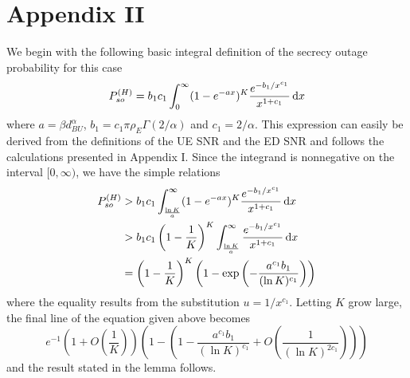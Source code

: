 \documentclass[10pt]{IEEEtran}
\newcommand{\rmd}{\,{\rm d}}
\begin{document}
\section*{Appendix II}\label{app2}
We begin with the following basic integral definition of the secrecy outage probability for this case
\begin{equation}
  P_{so}^{(H)} = b_1 c_1\int_{0}^{\infty}(1-e^{-a x})^K\frac{e^{-b_1/x^{c_1}}}{x^{{1+c_1}}} \rmd x
\end{equation}
where $a = \beta d_{BU}^\alpha$, $b_1 = c_1\pi \rho_E \Gamma(2/\alpha)$ and $c_1 = 2/\alpha$.  This expression can easily be derived from the definitions of the UE SNR and the ED SNR and follows the calculations presented in Appendix I.  Since the integrand is nonnegative on the interval $[0,\infty)$, we have the simple relations
\begin{align}
  P_{so}^{(H)} &> b_1 c_1\int_{\frac{\ln K}{a}}^{\infty}(1-e^{-a x})^K\frac{e^{-b_1/x^{c_1}}}{x^{{1+c_1}}} \rmd x \nonumber \\
  & > b_1 c_1 \left(1-\frac 1 K\right)^K\int_{\frac{\ln K}{a}}^{\infty}\frac{e^{-b_1/x^{c_1}}}{x^{{1+c_1}}} \rmd x  \nonumber \\
  & = \left(1-\frac 1 K\right)^K\left(1 - \exp\left(-\frac{a^{c_1} b_1}{(\ln K)^{c_1}}\right)\right)
\end{align}
where the equality results from the substitution $u = 1/x^{c_1}$.  Letting $K$ grow large, the final line of the equation given above becomes
\begin{equation}
 e^{-1}\left(1 + O\!\left(\frac 1 K\right)\right)
   \left(1 - \left(1-\frac{a^{c_1} b_1}{(\ln K)^{c_1}}+ O\!\left(\frac{1}{(\ln K)^{2c_1}}\right)\right)\right)
\end{equation}
and the result stated in the lemma follows.
\end{document}
